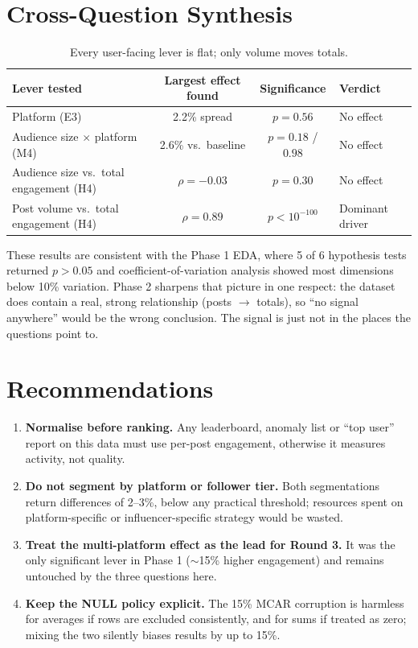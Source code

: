 \documentclass[11pt,a4paper]{article}
\begin{document}
\section{Cross-Question Synthesis}

\begin{table}[H]
\centering\small
\begin{tabular}{@{}lccl@{}}
\toprule
\textbf{Lever tested} & \textbf{Largest effect found} & \textbf{Significance} & \textbf{Verdict} \\
\midrule
Platform (E3) & 2.2\% spread & $p = 0.56$ & No effect \\
Audience size $\times$ platform (M4) & 2.6\% vs.\ baseline & $p = 0.18$ / $0.98$ & No effect \\
Audience size vs.\ total engagement (H4) & $\rho = -0.03$ & $p = 0.30$ & No effect \\
Post volume vs.\ total engagement (H4) & $\rho = 0.89$ & $p < 10^{-100}$ & Dominant driver \\
\bottomrule
\end{tabular}
\caption{Every user-facing lever is flat; only volume moves totals.}
\end{table}

These results are consistent with the Phase 1 EDA, where 5 of 6 hypothesis tests returned $p > 0.05$ and coefficient-of-variation analysis showed most dimensions below 10\% variation. Phase 2 sharpens that picture in one respect: the dataset does contain a real, strong relationship (posts $\rightarrow$ totals), so ``no signal anywhere'' would be the wrong conclusion. The signal is just not in the places the questions point to.

\section{Recommendations}

\begin{enumerate}[leftmargin=*]
  \item \textbf{Normalise before ranking.} Any leaderboard, anomaly list or ``top user'' report on this data must use per-post engagement, otherwise it measures activity, not quality.
  \item \textbf{Do not segment by platform or follower tier.} Both segmentations return differences of 2--3\%, below any practical threshold; resources spent on platform-specific or influencer-specific strategy would be wasted.
  \item \textbf{Treat the multi-platform effect as the lead for Round 3.} It was the only significant lever in Phase 1 ($\sim$15\% higher engagement) and remains untouched by the three questions here.
  \item \textbf{Keep the NULL policy explicit.} The 15\% MCAR corruption is harmless for averages if rows are excluded consistently, and for sums if treated as zero; mixing the two silently biases results by up to 15\%.
\end{enumerate}
\end{document}
